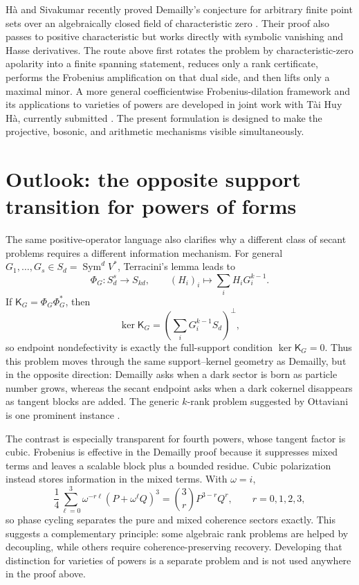 \documentclass[11pt]{article}
\theoremstyle{remark}
\newcommand{\Sym}{\operatorname{Sym}}
\begin{document}
H\`a and Sivakumar recently proved Demailly's conjecture for arbitrary finite point sets over an algebraically closed field of characteristic zero \cite{HaSivakumar2026}.  Their proof also passes to positive characteristic but works directly with symbolic vanishing and Hasse derivatives.  The route above first rotates the problem by characteristic-zero apolarity into a finite spanning statement, reduces only a rank certificate, performs the Frobenius amplification on that dual side, and then lifts only a maximal minor.  A more general coefficientwise Frobenius-dilation framework and its applications to varieties of powers are developed in joint work with T\`ai Huy H\`a, currently submitted \cite{DinhHa2026}.  The present formulation is designed to make the projective, bosonic, and arithmetic mechanisms visible simultaneously.

\section{Outlook: the opposite support transition for powers of forms}

The same positive-operator language also clarifies why a different class of secant problems requires a different information mechanism.  For general $G_1,\ldots,G_s\in S_d=\Sym^dV^*$, Terracini's lemma leads to
\[
  \Phi_G:S_d^s\longrightarrow S_{kd},
  \qquad
  (H_i)_i\longmapsto\sum_i H_iG_i^{k-1}.
\]
If $\mathsf K_G=\Phi_G\Phi_G^*$, then
\[
  \ker\mathsf K_G
  =\left(\sum_iG_i^{k-1}S_d\right)^\perp,
\]
so endpoint nondefectivity is exactly the full-support condition $\ker\mathsf K_G=0$.  Thus this problem moves through the same support--kernel geometry as Demailly, but in the opposite direction: Demailly asks when a dark sector is born as particle number grows, whereas the secant endpoint asks when a dark cokernel disappears as tangent blocks are added.  The generic $k$-rank problem suggested by Ottaviani is one prominent instance \cite{LORS2018}.

The contrast is especially transparent for fourth powers, whose tangent factor is cubic.  Frobenius is effective in the Demailly proof because it suppresses mixed terms and leaves a scalable block plus a bounded residue.  Cubic polarization instead stores information in the mixed terms.  With $\omega=i$,
\begin{equation}
  \frac14\sum_{\ell=0}^3\omega^{-r\ell}(P+\omega^\ell Q)^3
  =\binom3rP^{3-r}Q^r,
  \qquad r=0,1,2,3,
  \label{eq:phasecycling}
\end{equation}
so phase cycling separates the pure and mixed coherence sectors exactly.  This suggests a complementary principle: some algebraic rank problems are helped by decoupling, while others require coherence-preserving recovery.  Developing that distinction for varieties of powers is a separate problem and is not used anywhere in the proof above.
\end{document}
